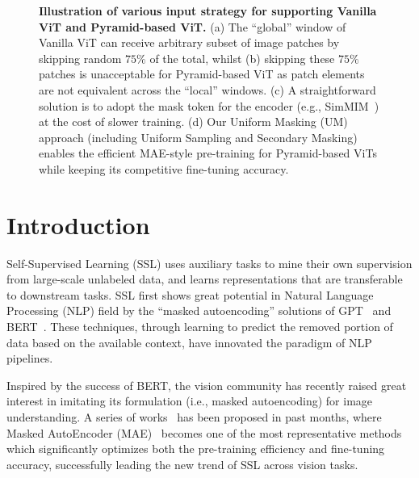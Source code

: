 \documentclass{article}
\begin{document}
\begin{figure}[t]
	\vspace{0pt}
	\begin{center}
		\setlength{\fboxrule}{0pt}
	\end{center}	
	\vspace{-9pt}
	\caption{\textbf{Illustration of various input strategy for supporting Vanilla ViT and Pyramid-based ViT.} (a) The ``global'' window of Vanilla ViT can receive arbitrary subset of image patches by skipping random $75\%$ of the total, whilst (b) skipping these $75\%$ patches is unacceptable for Pyramid-based ViT as patch elements are not equivalent across the ``local'' windows. (c) A straightforward solution is to adopt
    the mask token for the encoder (e.g.,  SimMIM~\cite{xie2021simmim}) at the cost of slower training. (d) Our Uniform Masking (UM) approach (including Uniform Sampling and Secondary Masking) enables the efficient MAE-style pre-training for Pyramid-based ViTs while keeping its competitive fine-tuning accuracy.
}
	\label{fig_pipeline}
	\vspace{-10pt}
\end{figure}

\section{Introduction}
Self-Supervised Learning (SSL) uses auxiliary tasks to mine their own supervision from large-scale unlabeled data, and learns representations that are transferable to downstream tasks. SSL first shows great potential in Natural Language Processing (NLP) field by the ``masked autoencoding'' solutions of GPT~\cite{radford2018improving,radford2019language,brown2020language} and BERT~\cite{devlin2018bert}. These techniques, through learning to predict the removed portion of data based on the available context, have innovated the paradigm of NLP pipelines.

Inspired by the success of BERT, the vision community has recently raised great interest in imitating its formulation (i.e., masked autoencoding) for image understanding. A series of works~\cite{bao2021beit,dong2021peco,zhou2021ibot,chen2022context,he2021masked,xie2021simmim,wei2021masked,tong2022videomae} has been proposed in past months, where Masked AutoEncoder (MAE)~\cite{he2021masked} becomes one of the most representative methods which significantly optimizes both the pre-training efficiency and fine-tuning accuracy, successfully leading the new trend of SSL across vision tasks.
\end{document}
